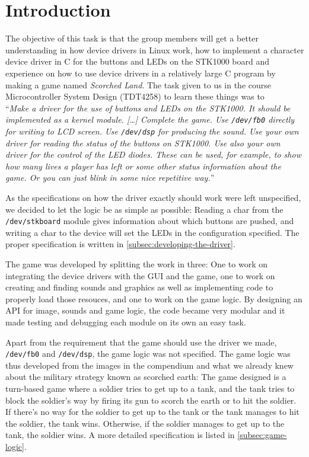 \section{Introduction}

The objective of this task is that the group members will get a better
understanding in how device drivers in Linux work, how to implement a
character device driver in C for the buttons and LEDs on the STK1000
board and experience on how to use device drivers in a relatively large
C program by making a game named {\em Scorched Land}. The task given to
us in the course Microcontroller System Design (TDT4258) to learn these
things was to \\
``{\em Make a driver for the use of buttons and LEDs on the STK1000. It
should be implemented as a kernel module. [\ldots] Complete the game.
Use \texttt{/dev/fb0} directly for writing to LCD screen. Use
\texttt{/dev/dsp} for producing the sound. Use your own driver for
reading the status of the buttons on STK1000. Use also your own driver
for the control of the LED diodes.  These can be used, for example, to
show how many lives a player has left or some other status information
about the game. Or you can just blink in some nice repetitive
way.}''\cite{comp}

As the specifications on how the driver exactly should work were left
unspecified, we decided to let the logic be as simple as possible:
Reading a char from the \texttt{/dev/stkboard} module gives information
about which buttons are pushed, and writing a char to the device will
set the LEDs in the configuration specified. The proper specification is
written in \ref{subsec:developing-the-driver}.

The game was developed by splitting the work in three: One to work on
integrating the device drivers with the GUI and the game, one to work on
creating and finding sounds and graphics as well as implementing code to
properly load those resouces, and one to work on the game logic. By
designing an API for image, sounds and game logic, the code became
very modular and it made testing and debugging each module on
its own an easy task.

Apart from the requirement that the game should use the driver we made,
\texttt{/dev/fb0} and \texttt{/dev/dsp}, the game logic was not
specified. The game logic was thus developed from the images in the
compendium\cite{comp} and what we already knew about the military
strategy known as scorched earth: The game designed is a turn-based game
where a soldier tries to get up to a tank, and the tank tries to block
the soldier's way by firing its gun to scorch the earth or to hit the
soldier. If there's no way for the soldier to get up to the tank or the
tank manages to hit the soldier, the tank wins. Otherwise, if the
soldier manages to get up to the tank, the soldier wins. A more detailed
specification is listed in \ref{subsec:game-logic}.

